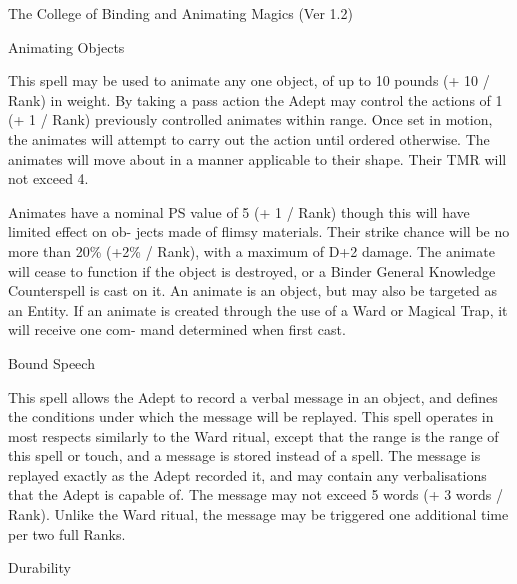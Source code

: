 \begin{Chapter}{The College of Binding and Animating Magics (Ver 1.2)}
\begin{spell}[G-2]{Animating Objects }

\begin{effects}
This spell may be used to animate any one object, of up to 10 pounds
(+ 10 / Rank) in weight.  By taking a pass action the Adept may
control the actions of 1 (+ 1 / Rank) previously controlled animates
within range.  Once set in motion, the animates will attempt to carry
out the action until ordered otherwise.  The animates will move about
in a manner applicable to their shape.  Their TMR will not exceed 4.

Animates have a nominal PS value of 5 (+ 1 / Rank) though this will
have limited effect on ob- jects made of flimsy materials. Their
strike chance will be no more than 20\% (+2\% / Rank), with a maximum
of D+2 damage. The animate will cease to function if the object is
destroyed, or a Binder General Knowledge Counterspell is cast on it.
An animate is an object, but may also be targeted as an Entity. If an
animate is created through the use of a Ward or Magical Trap, it will
receive one com- mand determined when first cast.
\end{effects}
\end{spell}

\begin{spell}[G-3]{Bound Speech }

\begin{effects}
This spell allows the Adept to record a verbal message in an object,
and defines the conditions under which the message will be replayed.
This spell operates in most respects similarly to the Ward ritual,
except that the range is the range of this spell or touch, and a
message is stored instead of a spell.  The message is replayed exactly
as the Adept recorded it, and may contain any verbalisations that the
Adept is capable of.  The message may not exceed 5 words (+ 3 words /
Rank).  Unlike the Ward ritual, the message may be triggered one
additional time per two full Ranks.
\end{effects}
\end{spell}

\begin{spell}[G-4]{Durability }


\end{spell}
\end{Chapter}
